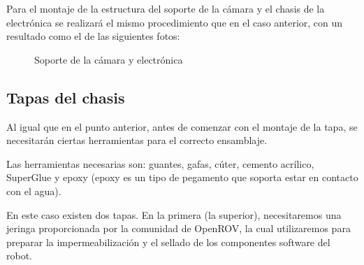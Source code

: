 Para el montaje de la estructura del soporte de la cámara y el chasis de la electrónica se realizará el mismo procedimiento que en el caso anterior, con un resultado como el de las siguientes fotos:

\begin{figure}[hbtp]
  \begin{center}
  \end{center}
  \caption{Soporte de la cámara y electrónica}
  \label{fig:ROV-chasis}
\end{figure}

\subsection{Tapas del chasis}
\label{subsec:tapasChasis}

Al igual  que en el punto anterior, antes de comenzar con el montaje de la tapa, se necesitarán ciertas herramientas para el correcto ensamblaje.

Las herramientas necesarias son: guantes, gafas, cúter, cemento acrílico, SuperGlue y epoxy (epoxy es un tipo de pegamento que soporta estar en contacto con el agua).

En este caso existen dos tapas. En la primera (la superior), necesitaremos una jeringa proporcionada por la comunidad de OpenROV, la cual utilizaremos para preparar la impermeabilización y el sellado de los componentes software del robot.

